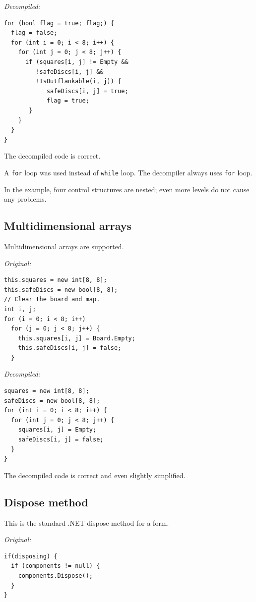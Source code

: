 \documentclass[12pt,twoside,notitlepage]{report}
\begin{document}
\emph{Decompiled:}
\begin{verbatim}
for (bool flag = true; flag;) {
  flag = false;
  for (int i = 0; i < 8; i++) {
    for (int j = 0; j < 8; j++) {
      if (squares[i, j] != Empty &&
         !safeDiscs[i, j] &&
         !IsOutflankable(i, j)) {
            safeDiscs[i, j] = true;
            flag = true;
       }
    }
  }
}
\end{verbatim}

The decompiled code is correct.

A \verb|for| loop was used instead of \verb|while| loop.
The decompiler always uses \verb|for| loop.

In the example, four control structures are nested;
even more levels do not cause any problems.





\subsection{Multidimensional arrays}

Multidimensional arrays are supported.

\emph{Original:}
\begin{verbatim}
this.squares = new int[8, 8];
this.safeDiscs = new bool[8, 8];
// Clear the board and map.
int i, j;
for (i = 0; i < 8; i++)
  for (j = 0; j < 8; j++) {
    this.squares[i, j] = Board.Empty;
    this.safeDiscs[i, j] = false;
  }
\end{verbatim}

\emph{Decompiled:}
\begin{verbatim}
squares = new int[8, 8];
safeDiscs = new bool[8, 8];
for (int i = 0; i < 8; i++) {
  for (int j = 0; j < 8; j++) {
    squares[i, j] = Empty;
    safeDiscs[i, j] = false;
  }
}
\end{verbatim}

The decompiled code is correct and even slightly simplified.





\subsection{Dispose method}

This is the standard .NET dispose method for a form.

\emph{Original:}
\begin{verbatim}
if(disposing) {
  if (components != null) {
    components.Dispose();
  }
}
\end{verbatim}
\end{document}

